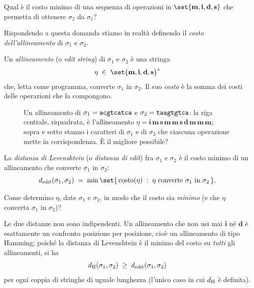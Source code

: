 Qual è il costo minimo di una sequenza di operazioni in
$\set{\mathbf{m},\mathbf{i},\mathbf{d},\mathbf{s}}$ che permetta di ottenere
$\sigma_2$ da $\sigma_1$?

\begin{osservazione}
  Rispondendo a questa domanda stiamo in realtà definendo il \emph{costo
  dell'allineamento} di $\sigma_1$ e $\sigma_2$.
\end{osservazione}

\begin{definizione}[Allineamento]
  \label{def:allineamento}
  Un \emph{allineamento} (o \emph{edit string}) di $\sigma_1$ e $\sigma_2$ è una
  stringa
  \[
    \eta \;\in\; \set{\mathbf{m},\mathbf{i},\mathbf{d},\mathbf{s}}^{*}
  \]
  che, letta come programma, converte $\sigma_1$ in $\sigma_2$. Il suo
  \emph{costo} è la somma dei costi delle operazioni che la compongono.
\end{definizione}

\begin{figure}[H]
  \centering
  
  \caption{Un allineamento di $\sigma_1=\texttt{acgtcatca}$ e
  $\sigma_2=\texttt{taagtgtca}$: la riga centrale, riquadrata, è l'allineamento
  $\eta=\mathbf{i}\,\mathbf{m}\,\mathbf{s}\,\mathbf{m}\,\mathbf{m}\,\mathbf{s}\,\mathbf{d}\,\mathbf{m}\,\mathbf{m}\,\mathbf{m}$;
  sopra e sotto stanno i caratteri di $\sigma_1$ e di $\sigma_2$ che ciascuna
  operazione mette in corrispondenza. È il migliore possibile?}
  \label{fig:allineamento-esempio}
\end{figure}

\begin{definizione}
  \label{def:levenshtein}
  La \emph{distanza di Levenshtein} (o \emph{distanza di edit}) fra $\sigma_1$ e
  $\sigma_2$ è il costo minimo di un allineamento che converte $\sigma_1$ in
  $\sigma_2$:
  \[
    \dedit(\sigma_1,\sigma_2)\;=\;\min\set{\,\mathrm{costo}(\eta)\;:\;
      \eta \text{ converte } \sigma_1 \text{ in } \sigma_2\,}.
  \]
\end{definizione}

\begin{domanda}[Problema]
  Come determino $\eta$, date $\sigma_1$ e $\sigma_2$, in modo che il costo sia
  \emph{minimo} (e che $\eta$ converta $\sigma_1$ in $\sigma_2$)?
\end{domanda}

Le due distanze non sono indipendenti. Un allineamento che non usi mai
$\mathbf{i}$ né $\mathbf{d}$ è esattamente un confronto posizione per posizione,
cioè un allineamento di tipo Hamming; poiché la distanza di Levenshtein è il
minimo del costo su \emph{tutti} gli allineamenti, si ha
\[
  d_{\mathrm{H}}(\sigma_1,\sigma_2) \;\ge\; d_{\mathrm{edit}}(\sigma_1,\sigma_2)
\]
per ogni coppia di stringhe di uguale lunghezza (l'unico caso in cui $d_{\mathrm{H}}$ è
definita).


